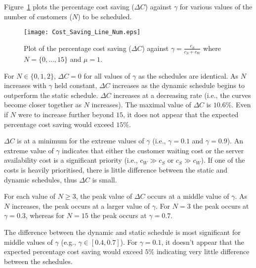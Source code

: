 Figure~\ref{Graph_Cost_Saving} plots the percentage cost saving ($\Delta C$) against $\gamma$ for various values of the number of customers ($N$) to be scheduled. 
\begin{figure}[htb]
	\centering
	\texttt{[image: Cost\_Saving\_Line\_Num.eps]}
	\caption{Plot of the percentage cost saving ($\Delta C$) against $\gamma = \frac{c_{S}}{c_{S} + c_{W}}$ where $N = \{ 0, \ldots, 15 \}$ and $\mu = 1$.}
	\label{Graph_Cost_Saving}
\end{figure}

For $N \in \{ 0, 1, 2 \}$, $\Delta C = 0$ for all values of $\gamma$ as the schedules are identical. As $N$ increases with $\gamma$ held constant, $\Delta C$ increases as the dynamic schedule begins to outperform the static schedule. $\Delta C$ increases at a decreasing rate (i.e., the curves become closer together as $N$ increases). The maximal value of $\Delta C$ is $10.6 \%$. Even if $N$ were to increase further beyond $15$, it does not appear that the expected percentage cost saving would exceed $15 \%$.

$\Delta C$ is at a minimum for the extreme values of $\gamma$ (i.e., $\gamma = 0.1$ and $\gamma = 0.9$). An extreme value of $\gamma$ indicates that either the customer waiting cost or the server availability cost is a significant priority (i.e., $c_{W} \gg c_{S}$ or $c_{S} \gg c_{W}$). If one of the costs is heavily prioritised, there is little difference between the static and dynamic schedules, thus $\Delta C$ is small.

For each value of $N \geq 3$, the peak value of $\Delta C$ occurs at a middle value of $\gamma$. As $N$ increases, the peak occurs at a larger value of $\gamma$. For $N = 3$ the peak occurs at $\gamma = 0.3$, whereas for $N = 15$ the peak occurs at $\gamma = 0.7$.

The difference between the dynamic and static schedule is most significant for middle values of $\gamma$ (e.g., $\gamma \in [0.4, 0.7]$). For $\gamma = 0.1$, it doesn't appear that the expected percentage cost saving would exceed $5 \%$ indicating very little difference between the schedules.
